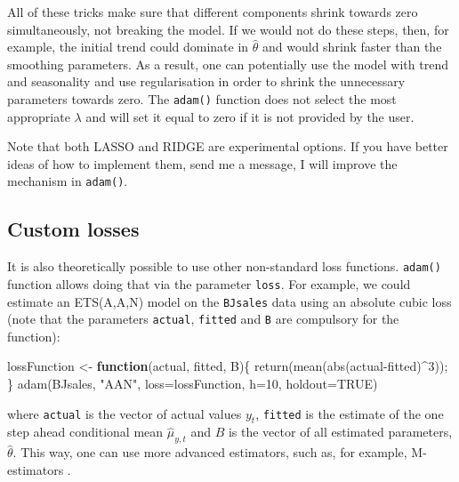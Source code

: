 \documentclass[
]{book}
\newenvironment{Shaded}{\begin{snugshade}}{\end{snugshade}}
\newcommand{\AttributeTok}[1]{\textcolor[rgb]{0.77,0.63,0.00}{#1}}
\newcommand{\ConstantTok}[1]{\textcolor[rgb]{0.00,0.00,0.00}{#1}}
\newcommand{\ControlFlowTok}[1]{\textcolor[rgb]{0.13,0.29,0.53}{\textbf{#1}}}
\newcommand{\DecValTok}[1]{\textcolor[rgb]{0.00,0.00,0.81}{#1}}
\newcommand{\FunctionTok}[1]{\textcolor[rgb]{0.00,0.00,0.00}{#1}}
\newcommand{\NormalTok}[1]{#1}
\newcommand{\OtherTok}[1]{\textcolor[rgb]{0.56,0.35,0.01}{#1}}
\newcommand{\SpecialCharTok}[1]{\textcolor[rgb]{0.00,0.00,0.00}{#1}}
\newcommand{\StringTok}[1]{\textcolor[rgb]{0.31,0.60,0.02}{#1}}
\theoremstyle{definition}
\theoremstyle{definition}
\theoremstyle{definition}
\theoremstyle{definition}
\theoremstyle{remark}
\begin{document}
All of these tricks make sure that different components shrink towards zero simultaneously, not breaking the model. If we would not do these steps, then, for example, the initial trend could dominate in \(\hat{\theta}\) and would shrink faster than the smoothing parameters. As a result, one can potentially use the model with trend and seasonality and use regularisation in order to shrink the unnecessary parameters towards zero. The \texttt{adam()} function does not select the most appropriate \(\lambda\) and will set it equal to zero if it is not provided by the user.

Note that both LASSO and RIDGE are experimental options. If you have better ideas of how to implement them, send me a message, I will improve the mechanism in \texttt{adam()}.

\hypertarget{custom-losses}{%
\subsection{Custom losses}\label{custom-losses}}

It is also theoretically possible to use other non-standard loss functions. \texttt{adam()} function allows doing that via the parameter \texttt{loss}. For example, we could estimate an ETS(A,A,N) model on the \texttt{BJsales} data using an absolute cubic loss (note that the parameters \texttt{actual}, \texttt{fitted} and \texttt{B} are compulsory for the function):

\begin{Shaded}
\begin{Highlighting}[]
\NormalTok{lossFunction }\OtherTok{\textless{}{-}} \ControlFlowTok{function}\NormalTok{(actual, fitted, B)\{}
  \FunctionTok{return}\NormalTok{(}\FunctionTok{mean}\NormalTok{(}\FunctionTok{abs}\NormalTok{(actual}\SpecialCharTok{{-}}\NormalTok{fitted)}\SpecialCharTok{\^{}}\DecValTok{3}\NormalTok{));}
\NormalTok{\}}
\FunctionTok{adam}\NormalTok{(BJsales, }\StringTok{"AAN"}\NormalTok{, }\AttributeTok{loss=}\NormalTok{lossFunction, }\AttributeTok{h=}\DecValTok{10}\NormalTok{, }\AttributeTok{holdout=}\ConstantTok{TRUE}\NormalTok{)}
\end{Highlighting}
\end{Shaded}

where \texttt{actual} is the vector of actual values \(y_t\), \texttt{fitted} is the estimate of the one step ahead conditional mean \(\hat{\mu}_{y,t}\) and \(B\) is the vector of all estimated parameters, \(\hat{\theta}\). This way, one can use more advanced estimators, such as, for example, M-estimators \citep{Barrow2020}.
\end{document}

